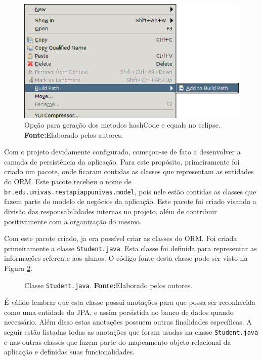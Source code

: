 	\begin{figure}[h!]
		\centerline{\includegraphics[scale=0.8]{./imagens/2_q_metodologico/4_procedimentos_resultados/43_webservice/432_desenvolvimento/desws6_3.png}}
		\caption[Opção para geração dos metodos hashCode e equals no Eclipse]{Opção
		para geração dos metodos hashCode e equals no eclipse.
			\textbf{Fonte:}Elaborado pelos autores.}
		\label{fig:desws6_3}
	\end{figure}
	
	\par Com o projeto devidamente configurado, começou-se de fato a desenvolver a
camada de persistência da aplicação. Para este propósito, primeiramente foi
criado um pacote, onde ficaram contidas as classes que representam as entidades
do ORM. Este pacote recebeu o nome de
\texttt{br.edu.univas.restapiappunivas.model},  pois nele estão contidas as
classes que fazem parte do modelo de negócios da aplicação. Este pacote foi
criado visando a divisão das responsabilidades internas no projeto, além de
contribuir positivamente com a organização do mesmo. 
	
	\par Com este pacote criado, ja era possível criar as classes do ORM. Foi
criada primeiramente a classe \texttt{Student.java}. Esta classe foi definida
para representar as informações referente aos alunos. O código fonte desta
classe pode ser visto na Figura \ref{fig:desws11}.
	
	
	\begin{figure}[h!]
		
		\caption[Classe Student.java]{Classe \texttt{Student.java}.
			\textbf{Fonte:}Elaborado pelos autores.}
		\label{fig:desws11}
	\end{figure}
	
	\pagebreak
	
	\par É válido lembrar que esta classe possui anotações para que possa ser
reconhecida como uma entidade do JPA, e assim persistida no banco de dados
quando necessário. Além disso estas anotações possuem outras finalidades
específicas. A seguir estão listadas todas as anotações  que foram usadas na
classe \texttt{Student.java} e nas outras classes que fazem parte do mapeamento
objeto relacional da aplicação e definidas suas funcionalidades.

